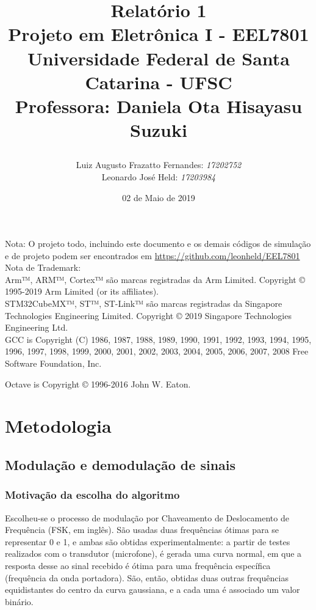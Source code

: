 \documentclass[11pt,a4paper]{report}
\title{Relatório 1  \\
	Projeto em Eletrônica I - EEL7801 \\ \vfill
	\normalsize{Universidade Federal de Santa Catarina - UFSC \\
		Professora: Daniela Ota Hisayasu Suzuki}
	\author{
		{Luiz Augusto Frazatto Fernandes: \it{17202752}} \\
		{Leonardo José Held: \it{17203984}}
	}
}
\date{02 de Maio de 2019}
\begin{document}
	

	\maketitle
		\newpage Nota: O projeto todo, incluindo este documento e os demais códigos de simulação e de projeto podem ser encontrados em \url{https://github.com/leonheld/EEL7801}
	\\
	
	Nota de Trademark: \\
	
	Arm™, ARM™, Cortex™ são marcas registradas da Arm Limited.
	Copyright © 1995-2019 Arm Limited (or its affiliates).\\
	
	STM32CubeMX™, ST™, ST-Link™ são marcas registradas da Singapore Technologies Engineering Limited.
	Copyright © 2019 Singapore Technologies Engineering Ltd.\\
	
	GCC is Copyright (C) 1986, 1987, 1988, 1989, 1990, 1991, 1992, 1993, 1994,
	1995, 1996, 1997, 1998, 1999, 2000, 2001, 2002, 2003, 2004, 2005, 2006, 2007,
	2008 Free Software Foundation, Inc.
	
	Octave is Copyright © 1996-2016 John W. Eaton. 
	
	\setcounter{chapter}{0}
	\chapter{Metodologia}
	\section{Modulação e demodulação de sinais}
	\subsection{Motivação da escolha do algoritmo}
	
	Escolheu-se o processo de modulação por Chaveamento de Deslocamento de Frequência (FSK, em inglês). São usadas duas frequências ótimas para se representar 0 e 1, e ambas são obtidas experimentalmente: a partir de testes realizados com o transdutor (microfone), é gerada uma curva normal, em que a resposta desse ao sinal recebido é ótima para uma frequência específica (frequência da onda portadora). São, então, obtidas duas outras frequências equidistantes do centro da curva gaussiana, e a cada uma é associado um valor binário.\\
	
\end{document}
